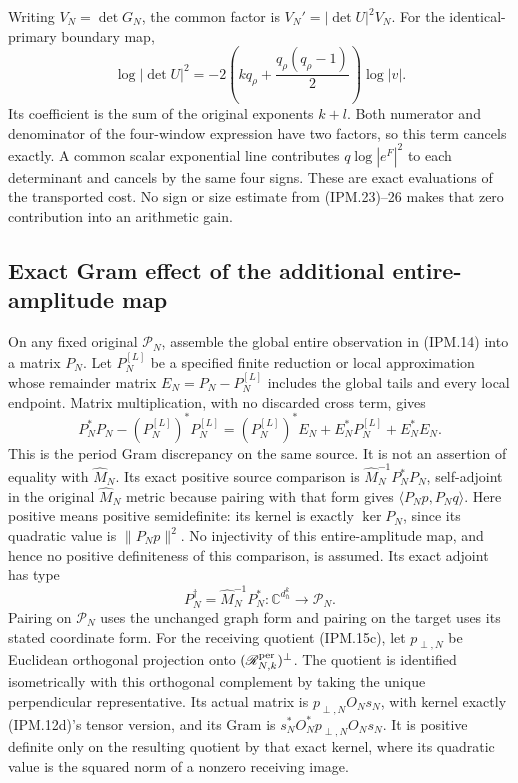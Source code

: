 \documentclass[11pt,a4paper]{article}
\theoremstyle{definition}
\begin{document}
Writing \(V_N=\det G_N\), the common factor is
\(V_N'=|\det U|^2V_N\). For the identical-primary boundary map,
\[
 \log|\det U|^2
     =-2\left(kq_\rho+\frac{q_\rho(q_\rho-1)}2\right)\log|v|.
 \tag{IPM.36}
\]
Its coefficient is the sum of the original exponents \(k+l\).
Both numerator and denominator of the four-window expression have
two factors, so this term cancels exactly. A common scalar exponential
line contributes \(q\log|e^F|^2\) to each determinant and cancels by
the same four signs. These are exact evaluations of the transported
cost. No sign or size estimate from (IPM.23)--26 makes that zero
contribution into an arithmetic gain.

\subsection{Exact Gram effect of the additional entire-amplitude map}

On any fixed original \(\mathcal P_N\), assemble the global entire
observation in (IPM.14) into a matrix \(P_N\). Let \(P_N^{[L]}\)
be a specified finite reduction or local approximation whose remainder
matrix \(E_N=P_N-P_N^{[L]}\) includes the global tails and every
local endpoint. Matrix multiplication, with no discarded cross term,
gives
\[
 P_N^*P_N-(P_N^{[L]})^*P_N^{[L]}
   =(P_N^{[L]})^*E_N+E_N^*P_N^{[L]}+E_N^*E_N.
 \tag{IPM.37}
\]
This is the period Gram discrepancy on the same source. It is not an
assertion of equality with \(\widehat M_N\). Its exact positive
source comparison is
\(\widehat M_N^{-1}P_N^*P_N\), self-adjoint in the original
\(\widehat M_N\) metric because pairing with that form gives
\(\langle P_Np,P_Nq\rangle\).
Here positive means positive semidefinite: its kernel is exactly
\(\ker P_N\), since its quadratic value is \(\|P_Np\|^2\).
No injectivity of this entire-amplitude map, and hence no positive
definiteness of this comparison, is assumed. Its exact adjoint has
type
\[
 P_N^\dagger=\widehat M_N^{-1}P_N^*:
       \mathbb C^{d_h^k}\longrightarrow\mathcal P_N.
 \tag{IPM.37a}
\]
Pairing on \(\mathcal P_N\) uses the unchanged graph form and pairing
on the target uses its stated coordinate form. For the receiving
quotient (IPM.15c), let \(p_{\perp,N}\) be Euclidean orthogonal
projection onto \((\mathscr R_{N,k}^{\rm per})^\perp\). The quotient
is identified isometrically with this orthogonal complement by
taking the unique perpendicular representative. Its actual matrix
is \(p_{\perp,N}O_Ns_N\), with kernel exactly (IPM.12d)'s tensor
version, and its Gram is
\(s_N^*O_N^*p_{\perp,N}O_Ns_N\). It is positive definite only on
the resulting quotient by that exact kernel, where its quadratic
value is the squared norm of a nonzero receiving image.
\end{document}
